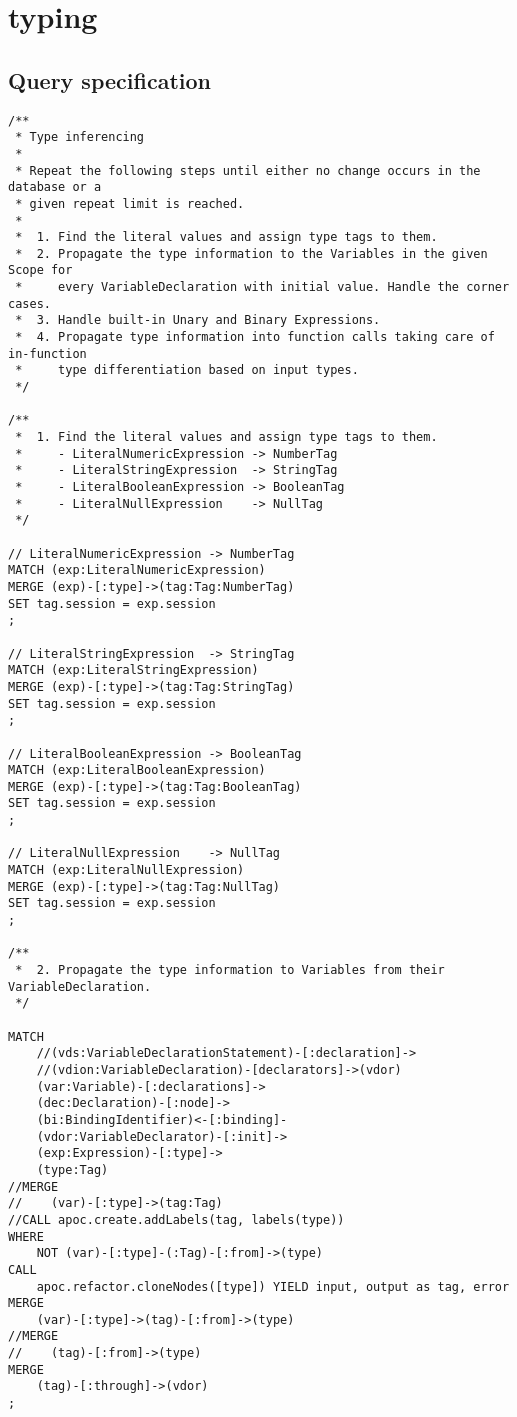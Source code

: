 \section{typing}

\subsection*{Query specification}

\begin{lstlisting}
/**
 * Type inferencing
 *
 * Repeat the following steps until either no change occurs in the database or a
 * given repeat limit is reached.
 *
 *  1. Find the literal values and assign type tags to them.
 *  2. Propagate the type information to the Variables in the given Scope for
 *     every VariableDeclaration with initial value. Handle the corner cases.
 *  3. Handle built-in Unary and Binary Expressions.
 *  4. Propagate type information into function calls taking care of in-function
 *     type differentiation based on input types.
 */

/**
 *  1. Find the literal values and assign type tags to them.
 *     - LiteralNumericExpression -> NumberTag
 *     - LiteralStringExpression  -> StringTag
 *     - LiteralBooleanExpression -> BooleanTag
 *     - LiteralNullExpression    -> NullTag
 */

// LiteralNumericExpression -> NumberTag
MATCH (exp:LiteralNumericExpression)
MERGE (exp)-[:type]->(tag:Tag:NumberTag)
SET tag.session = exp.session
;

// LiteralStringExpression  -> StringTag
MATCH (exp:LiteralStringExpression)
MERGE (exp)-[:type]->(tag:Tag:StringTag)
SET tag.session = exp.session
;

// LiteralBooleanExpression -> BooleanTag
MATCH (exp:LiteralBooleanExpression)
MERGE (exp)-[:type]->(tag:Tag:BooleanTag)
SET tag.session = exp.session
;

// LiteralNullExpression    -> NullTag
MATCH (exp:LiteralNullExpression)
MERGE (exp)-[:type]->(tag:Tag:NullTag)
SET tag.session = exp.session
;

/**
 *  2. Propagate the type information to Variables from their VariableDeclaration.
 */

MATCH
    //(vds:VariableDeclarationStatement)-[:declaration]->
    //(vdion:VariableDeclaration)-[declarators]->(vdor)
    (var:Variable)-[:declarations]->
    (dec:Declaration)-[:node]->
    (bi:BindingIdentifier)<-[:binding]-
    (vdor:VariableDeclarator)-[:init]->
    (exp:Expression)-[:type]->
    (type:Tag)
//MERGE
//    (var)-[:type]->(tag:Tag)
//CALL apoc.create.addLabels(tag, labels(type))
WHERE
    NOT (var)-[:type]-(:Tag)-[:from]->(type)
CALL
    apoc.refactor.cloneNodes([type]) YIELD input, output as tag, error
MERGE
    (var)-[:type]->(tag)-[:from]->(type)
//MERGE
//    (tag)-[:from]->(type)
MERGE
    (tag)-[:through]->(vdor)
;



\end{lstlisting}
